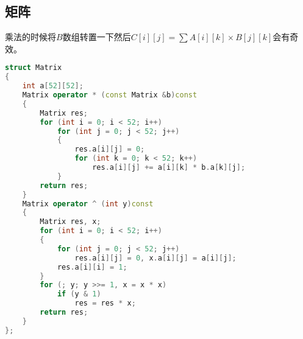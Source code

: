\subsection{矩阵}
	乘法的时候将$B$数组转置一下然后$C[i][j] = \sum{A[i][k]\times B[j][k]}$会有奇效。
	\begin{lstlisting}[language=c++]
struct Matrix
{
	int a[52][52];
	Matrix operator * (const Matrix &b)const
	{
		Matrix res;
		for (int i = 0; i < 52; i++)
			for (int j = 0; j < 52; j++)
			{
				res.a[i][j] = 0;
				for (int k = 0; k < 52; k++)
					res.a[i][j] += a[i][k] * b.a[k][j];
			}
		return res;
	}
	Matrix operator ^ (int y)const
	{
		Matrix res, x;
		for (int i = 0; i < 52; i++)
		{
			for (int j = 0; j < 52; j++)
				res.a[i][j] = 0, x.a[i][j] = a[i][j];
			res.a[i][i] = 1;
		}
		for (; y; y >>= 1, x = x * x)
			if (y & 1)
				res = res * x;
		return res;
	}
};
	\end{lstlisting}
